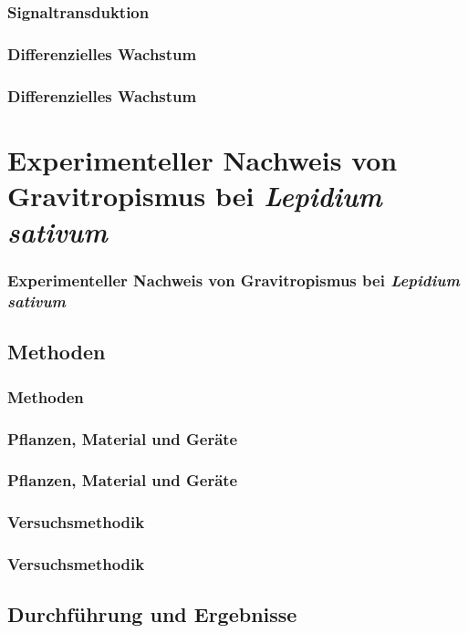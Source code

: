 \documentclass[aspectratio=169]{beamer}
\begin{document}
	\begin{frame}
		\frametitle{Signaltransduktion}
	\end{frame}
			
	\subsubsection{Differenzielles Wachstum}
		
	\begin{frame}
		\frametitle{Differenzielles Wachstum}
	\end{frame}
	
	\section{Experimenteller Nachweis von Gravitropismus bei \protect\emph{Lepidium sativum}}
	
	\begin{frame}
		\frametitle{Experimenteller Nachweis von Gravitropismus bei \protect\emph{Lepidium sativum}}
	\end{frame}	
	
	\subsection{Methoden}
	
	\begin{frame}
		\frametitle{Methoden}
	\end{frame}
	
	\subsubsection{Pflanzen, Material und Geräte}

	\begin{frame}
		\frametitle{Pflanzen, Material und Geräte}
	\end{frame}
	
	\subsubsection{Versuchsmethodik}
	
	\begin{frame}
		\frametitle{Versuchsmethodik}
	\end{frame}
	
	\subsection{Durchführung und Ergebnisse}
	
\end{document}
